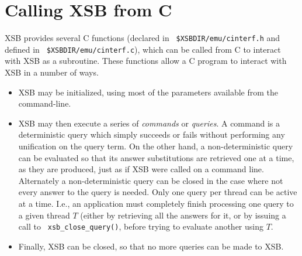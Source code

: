 %
\section{Calling XSB from C}

XSB provides several C functions (declared in {\tt
  \$XSBDIR/emu/cinterf.h} and defined in {\tt
  \$XSBDIR/emu/cinterf.c}), which can be called from C to interact
with XSB as a subroutine. These functions allow a C program to
interact with XSB in a number of ways.
\begin{itemize}
\item XSB may be initialized, using most of the parameters available
  from the command-line. 
%
\item XSB may then execute a series of {\em commands} or {\em
  queries}.  A command is a deterministic query which simply succeeds
  or fails without performing any unification on the query term.  On
  the other hand, a non-deterministic query can be evaluated so that
  its answer substitutions are retrieved one at a time, as they are
  produced, just as if XSB were called on a command line.  Alternately
  a non-deterministic query can be closed in the case where not every
  answer to the query is needed.  Only one query per thread can be
  active at a time.  I.e., an application must completely finish
  processing one query to a given thread $T$ (either by retrieving all
  the answers for it, or by issuing a call to {\tt
    xsb\_close\_query()}, before trying to evaluate another using $T$.
%
\item Finally, XSB can be closed, so that no more queries can be made
  to XSB.
\end{itemize}

